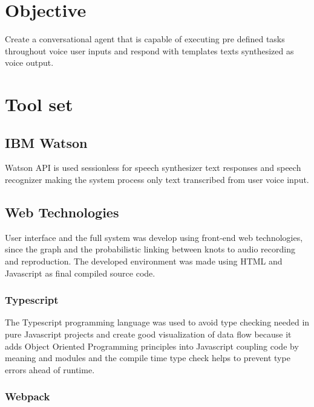 \documentclass[
	article,			%
	11pt,				%
	oneside,			%
	a4paper,			%
	english,			%
	english,				%
	]{abntex2}
\begin{document}
\section{Objective}

Create a conversational agent that is capable of executing pre defined tasks throughout
voice user inputs and respond with templates texts synthesized as voice output. 

\section{Tool set}

\subsection{IBM\textregistered{}  Watson\textregistered{}}

Watson API is used sessionless for speech synthesizer text responses and speech recognizer
making the system process only text transcribed from user voice input.

\subsection{Web Technologies}

User interface and the full system was develop using front-end web technologies, since the graph
and the probabilistic linking between knots to audio recording and reproduction.
The developed environment was made using HTML and Javascript as final compiled source code.

\subsubsection{Typescript}

The Typescript programming language was used to avoid type checking needed in pure Javascript 
projects and create good visualization of data flow because it adds Object Oriented Programming
principles into Javascript coupling code by meaning and modules and the compile time type check 
helps to prevent type errors ahead of runtime.

\subsubsection{Webpack}
\end{document}
